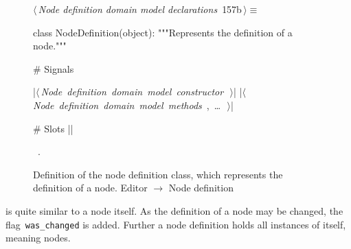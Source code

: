 \documentclass[%
    a4paper,    %
    justified,  %
    nobib,      %
    openany     %
]{tufte-book}
\makeatletter
\renewcommand{\label}[1]{\@tufte@label{##1}}%
\makeatother
\begin{document}
\begin{figure}[!htbp]
\begin{flushleft} \small
\begin{minipage}{\linewidth}\label{scrap119}\raggedright\small
{} $\langle\,${\itshape Node definition domain model declarations}\nobreak\ {\footnotesize {157b}}$\,\rangle\equiv$
\vspace{-1ex}
\begin{pythoncode}
class NodeDefinition(object):
    """Represents the definition of a node."""

    # Signals

    |\hbox{$\langle\,${\itshape Node definition domain model constructor}\nobreak\ {\footnotesize {}}$\,\rangle$}|
    |\hbox{$\langle\,${\itshape Node definition domain model methods}\nobreak\ {\footnotesize {}, \ldots\ }$\,\rangle$}|

    # Slots
|\NWsep|
\end{pythoncode}
\vspace{1.5ex}
\footnotesize
\begin{list}{}{\setlength{\itemsep}{-\parsep}\setlength{\itemindent}{-\leftmargin}}
\item \NWtxtMacroRefIn\ .

\item{}
\end{list}
\end{minipage}\vspace{4ex}
\end{flushleft}
\caption{Definition of the node definition class, which represents the definition
  of a node.
  \newline{}\newline{}Editor $\rightarrow$ Node definition}
\end{figure}

 is quite similar to a node itself. As the
definition of a node may be changed, the flag~\verb=was_changed= is added.
Further a node definition holds all instances of itself, meaning nodes.
\end{document}
